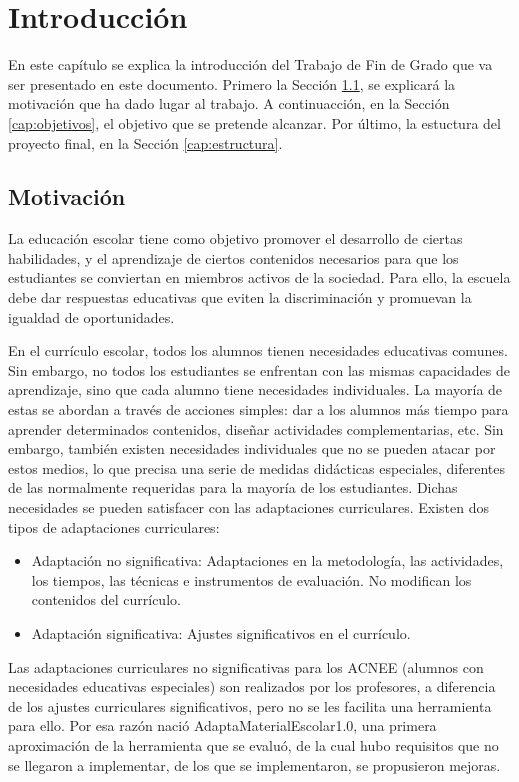 

\chapter{Introducción}
\label{ch:introduccion}

En este capítulo se explica la introducción del Trabajo de Fin de Grado que va ser presentado en este documento. Primero la Sección \ref{cap:motivacio}, se explicará la motivación que ha dado lugar al trabajo. A continuacción, en la Sección \ref{cap:objetivos}, el objetivo que se pretende alcanzar. Por último, la estuctura del proyecto final, en la Sección \ref{cap:estructura}.

\section{Motivación}\label{cap:motivacio}
La educación escolar tiene como objetivo promover el desarrollo de ciertas habilidades, y el aprendizaje de ciertos contenidos necesarios para que los estudiantes se conviertan en miembros activos de la sociedad. Para ello, la escuela debe dar respuestas educativas que eviten la discriminación y promuevan la igualdad de oportunidades.

En el currículo escolar, todos los alumnos tienen necesidades educativas comunes. Sin embargo, no todos los estudiantes se enfrentan con las mismas capacidades de aprendizaje, sino que cada alumno tiene necesidades individuales. La mayoría de estas se abordan a través de acciones simples: dar a los alumnos más tiempo para aprender determinados contenidos, diseñar actividades complementarias, etc.  Sin embargo, también existen necesidades individuales que no se pueden atacar por estos medios, lo que precisa una serie de medidas didácticas especiales, diferentes de las normalmente requeridas para la mayoría de los estudiantes. Dichas necesidades se pueden satisfacer con las adaptaciones curriculares. Existen dos tipos de adaptaciones curriculares:
\begin{itemize}
    \item Adaptación no significativa: Adaptaciones en la metodología, las actividades, los tiempos,
    las técnicas e instrumentos de evaluación. No modifican los contenidos del currículo.  
    \item Adaptación significativa: Ajustes significativos en el currículo. 
\end{itemize}
Las adaptaciones curriculares no significativas para los ACNEE (alumnos con necesidades educativas especiales) son realizados por los profesores, a diferencia de los ajustes curriculares significativos, pero no se les facilita una herramienta para ello. Por esa razón nació AdaptaMaterialEscolar1.0, una primera aproximación de la herramienta que se evaluó, de la cual hubo requisitos que no se llegaron a implementar, de los que se implementaron, se propusieron mejoras.

